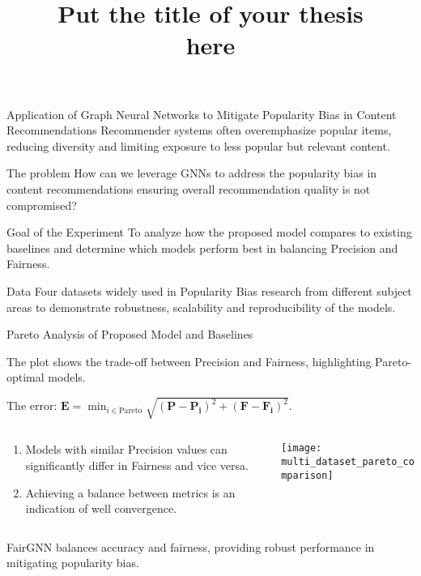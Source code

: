 \documentclass[10pt,pdf,hyperref={unicode}]{beamer}
\title{ Put the title of your thesis \\ here}
\begin{document}
\setcounter{page}{2}%
\begin{frame}{Application of Graph Neural Networks to Mitigate Popularity Bias in Content Recommendations}
    Recommender systems often overemphasize popular items, reducing diversity and limiting exposure to less popular but relevant content.

    \begin{block}{The problem}
        How can we leverage GNNs to address the popularity bias in content recommendations ensuring overall recommendation quality
        is not compromised?
    \end{block}

    \begin{block}{Goal of the Experiment}
        To analyze how the proposed model compares to existing baselines and determine which models perform best in balancing Precision and Fairness.
    \end{block}

    \begin{block}{Data}
        Four datasets widely used in Popularity Bias research from different subject areas to demonstrate robustness, scalability and reproducibility
        of the models.
    \end{block}
\end{frame}
\begin{frame}{Pareto Analysis of Proposed Model and Baselines}

The plot shows the trade-off between Precision and Fairness, highlighting Pareto-optimal models. 

The error: $\scriptstyle{\mathbf{E} = \min_{i \in \text{Pareto}} \sqrt{(\mathbf{P} - \mathbf{P_i})^2 + (\mathbf{F} - \mathbf{F_i})^2}}$.

\begin{columns}
    \begin{column}{0.3\textwidth}
        \begin{enumerate}[1]
            \item Models with similar Precision values can significantly differ in Fairness and vice versa.
            \item Achieving a balance between metrics is an indication of well convergence.
        \end{enumerate}
    \end{column}
    \begin{column}{0.8\textwidth}
	    \texttt{[image: multi\_dataset\_pareto\_comparison]}      
    \end{column}
\end{columns}

\bigskip

FairGNN balances accuracy and fairness, providing robust performance in mitigating popularity bias.
\end{frame}
\end{document}
